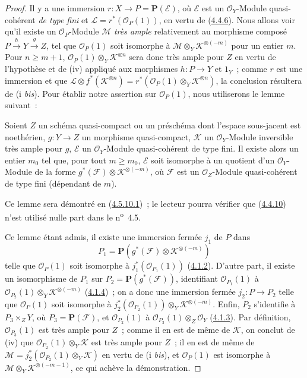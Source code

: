 \begin{proof}
Il y a une immersion $r:X\to P=\mathbf{P}(\mathcal{E})$, où $\mathcal{E}$ est
un $\mathcal{O}_Y$-Module quasi-cohérent \emph{de type fini} et
$\mathcal{L}=r^*(\mathcal{O}_P(1))$, en vertu de
(\hyperref[II.4.4.6-fr]{4.4.6}). Nous allons voir qu'il existe un
$\mathcal{O}_P$-Module $\mathcal{M}$ \emph{très ample} relativement au morphisme
composé $P\xrightarrow{h}Y\xrightarrow{g}Z$, tel que $\mathcal{O}_P(1)$ soit
isomorphe à $\mathcal{M}\otimes_Y\mathcal{K}^{\otimes(-m)}$ pour un entier
$m$. Pour $n\geq m+1$,
$\mathcal{O}_P(1)\otimes_Y\mathcal{K}^{\otimes n}$ sera donc très ample pour
$Z$ en vertu de l'hypothèse et de (iv) appliqué aux morphismes $h:P\to Y$ et
$1_Y$~; comme $r$ est une immersion et que
$\mathcal{L}\otimes f^*(\mathcal{K}^{\otimes n})
=r^*(\mathcal{O}_P(1)\otimes_Y\mathcal{K}^{\otimes n})$, la conclusion
résultera de (i \emph{bis}). Pour établir notre assertion sur $\mathcal{O}_P(1)$,
nous utiliserons le lemme suivant~:

\begin{lemma}[4.4.10.1]
\label{II.4.4.10.1-fr}
Soient $Z$ un schéma quasi-compact ou un préschéma dont l'espace sous-jacent
est noethérien, $g:Y\to Z$ un morphisme quasi-compact, $\mathcal{K}$ un
$\mathcal{O}_Y$-Module inversible très ample pour $g$, $\mathcal{E}$ un
$\mathcal{O}_Y$-Module quasi-cohérent de type fini. Il existe alors un entier
$m_0$ tel que, pour tout $m\geq m_0$, $\mathcal{E}$ soit isomorphe à un
quotient d'un $\mathcal{O}_Y$-Module de la forme
$g^*(\mathcal{F})\otimes\mathcal{K}^{\otimes(-m)}$, où $\mathcal{F}$ est un
$\mathcal{O}_Z$-Module quasi-cohérent de type fini (dépendant de $m$).
\end{lemma}

Ce lemme sera démontré en (\hyperref[II.4.5.10.1-fr]{4.5.10.1})~; le lecteur
pourra vérifier que (\hyperref[II.4.4.10-fr]{4.4.10}) n'est utilisé nulle part
dans le n\textsuperscript{o}~4.5.


Ce lemme étant admis, il existe une immersion fermée $j_1$ de $P$ dans
\[
  P_1=\mathbf{P}(g^*(\mathcal{F})\otimes\mathcal{K}^{\otimes(-m)})
\]
telle que $\mathcal{O}_P(1)$ soit isomorphe à
$j_1^*(\mathcal{O}_{P_1}(1))$ (\hyperref[II.4.1.2-fr]{4.1.2}). D'autre part,
il existe un isomorphisme de $P_1$ sur
$P_2=\mathbf{P}(g^*(\mathcal{F}))$, identifiant
$\mathcal{O}_{P_1}(1)$ à
$\mathcal{O}_{P_2}(1)\otimes_Y\mathcal{K}^{\otimes(-m)}$
(\hyperref[II.4.1.4-fr]{4.1.4})~; on a donc une immersion fermée
$j_2:P\to P_2$ telle que $\mathcal{O}_P(1)$ soit isomorphe à
$j_2^*(\mathcal{O}_{P_2}(1))\otimes_Y\mathcal{K}^{\otimes(-m)}$. Enfin,
$P_2$ s'identifie à $P_3\times_ZY$, où $P_3=\mathbf{P}(\mathcal{F})$, et
$\mathcal{O}_{P_2}(1)$ à
$\mathcal{O}_{P_3}(1)\otimes_Z\mathcal{O}_Y$
(\hyperref[II.4.1.3-fr]{4.1.3}). Par définition,
$\mathcal{O}_{P_3}(1)$ est très ample pour $Z$~; comme il en est de même de
$\mathcal{K}$, on conclut de (iv) que
$\mathcal{O}_{P_2}(1)\otimes_Y\mathcal{K}$ est très ample pour $Z$~; il en
est de même de
$\mathcal{M}=j_2^*(\mathcal{O}_{P_2}(1)\otimes_Y\mathcal{K})$ en vertu de
(i \emph{bis}), et $\mathcal{O}_P(1)$ est isomorphe à
$\mathcal{M}\otimes_Y\mathcal{K}^{\otimes(-m-1)}$, ce qui achève la
démonstration.
\end{proof}

